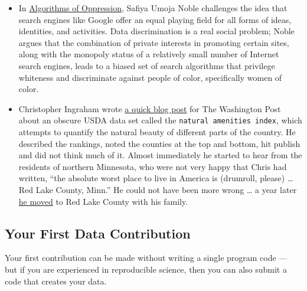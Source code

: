 \documentclass[
  a4paper,
  openany, a4paper, oneside]{book}
\begin{document}
\begin{itemize}
\item
  In \href{https://nyupress.org/9781479837243/algorithms-of-oppression/}{Algorithms of Oppression}, Safiya Umoja Noble challenges the idea that search engines like Google offer an equal playing field for all forms of ideas, identities, and activities. Data discrimination is a real social problem; Noble argues that the combination of private interests in promoting certain sites, along with the monopoly status of a relatively small number of Internet search engines, leads to a biased set of search algorithms that privilege whiteness and discriminate against people of color, specifically women of color.
\item
  Christopher Ingraham wrote \href{https://www.washingtonpost.com/gdpr-consent/?next_url=https\%3a\%2f\%2fwww.washingtonpost.com\%2fnews\%2fwonk\%2fwp\%2f2015\%2f08\%2f17\%2fevery-county-in-america-ranked-by-natural-beauty\%2f}{a quick blog post} for The Washington Post about an obscure USDA data set called the \texttt{natural\ amenities\ index}, which attempts to quantify the natural beauty of different parts of the country. He described the rankings, noted the counties at the top and bottom, hit publish and did not think much of it. Almost immediately he started to hear from the residents of northern Minnesota, who were not very happy that Chris had written, ``the absolute worst place to live in America is (drumroll, please) \ldots{} Red Lake County, Minn.'' He could not have been more wrong \ldots{} a year later \href{https://fivethirtyeight.com/features/he-called-it-americas-worst-place-to-live-now-hes-moving-there/}{he moved} to Red Lake County with his family.
\end{itemize}

\hypertarget{first-contribution}{%
\subsection{Your First Data Contribution}\label{first-contribution}}

Your first contribution can be made without writing a single program code --- but if you are experienced in reproducible science, then you can also submit a code that creates your data.
\end{document}

